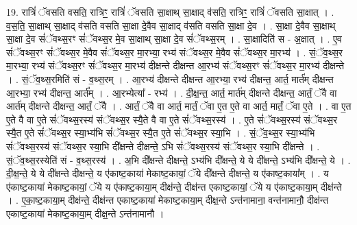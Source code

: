 \documentclass[17pt]{extarticle}
\begin{document}
19. रात्रिं॑ ॅवसति वसति॒ रात्रिꣳ॒॒ रात्रिं॑ ॅवसति सा॒क्षाथ् सा॒क्षाद् व॑सति॒ रात्रिꣳ॒॒ रात्रिं॑ ॅवसति सा॒क्षात् । . व॒स॒ति॒ सा॒क्षाथ् सा॒क्षाद् व॑सति वसति सा॒क्षा दे॒वैव सा॒क्षाद् व॑सति वसति सा॒क्षा दे॒व । . सा॒क्षा दे॒वैव सा॒क्षाथ् सा॒क्षा दे॒व सं॑ॅवथ्स॒रꣳ सं॑ॅवथ्स॒र मे॒व सा॒क्षाथ् सा॒क्षा दे॒व सं॑ॅवथ्स॒रम् । . सा॒क्षादिति॑ स - अ॒क्षात् । . ए॒व सं॑ॅवथ्स॒रꣳ सं॑ॅवथ्स॒र मे॒वैव सं॑ॅवथ्स॒र मा॒रभ्या॒ रभ्य॑ संॅवथ्स॒र मे॒वैव सं॑ॅवथ्स॒र मा॒रभ्य॑ । . सं॒ॅव॒थ्स॒र मा॒रभ्या॒ रभ्य॑ संॅवथ्स॒रꣳ सं॑ॅवथ्स॒र मा॒रभ्य॑ दीक्षन्ते दीक्षन्त आ॒रभ्य॑ संॅवथ्स॒रꣳ सं॑ॅवथ्स॒र मा॒रभ्य॑ दीक्षन्ते । . सं॒ॅव॒थ्स॒रमिति॑ सं - व॒थ्स॒रम् । . आ॒रभ्य॑ दीक्षन्ते दीक्षन्त आ॒रभ्या॒ रभ्य॑ दीक्षन्त॒ आर्त॒ मार्त॑म् दीक्षन्त आ॒रभ्या॒ रभ्य॑ दीक्षन्त॒ आर्त᳚म् । . आ॒रभ्येत्या᳚ - रभ्य॑ । . दी॒क्ष॒न्त॒ आर्त॒ मार्त॑म् दीक्षन्ते दीक्षन्त॒ आर्तं॒ ॅवै वा आर्त॑म् दीक्षन्ते दीक्षन्त॒ आर्तं॒ ॅवै । . आर्तं॒ ॅवै वा आर्त॒ मार्तं॒ ॅवा ए॒त ए॒ते वा आर्त॒ मार्तं॒ ॅवा ए॒ते । . वा ए॒त ए॒ते वै वा ए॒ते सं॑ॅवथ्स॒रस्य॑ संॅवथ्स॒र स्यै॒ते वै वा ए॒ते सं॑ॅवथ्स॒रस्य॑ । . ए॒ते सं॑ॅवथ्स॒रस्य॑ संॅवथ्स॒र स्यै॒त ए॒ते सं॑ॅवथ्स॒र स्या॒भ्य॑भि सं॑ॅवथ्स॒र स्यै॒त ए॒ते सं॑ॅवथ्स॒र स्या॒भि । . सं॒ॅव॒थ्स॒र स्या॒भ्य॑भि सं॑ॅवथ्स॒रस्य॑ संॅवथ्स॒र स्या॒भि दी᳚क्षन्ते दीक्षन्ते॒ ऽभि सं॑ॅवथ्स॒रस्य॑ संॅवथ्स॒र स्या॒भि दी᳚क्षन्ते । . सं॒ॅव॒थ्स॒रस्येति॑ सं - व॒थ्स॒रस्य॑ । . अ॒भि दी᳚क्षन्ते दीक्षन्ते॒ ऽभ्य॑भि दी᳚क्षन्ते॒ ये ये दी᳚क्षन्ते॒ ऽभ्य॑भि दी᳚क्षन्ते॒ ये । . दी॒क्ष॒न्ते॒ ये ये दी᳚क्षन्ते दीक्षन्ते॒ य ए॑काष्ट॒काया॑ मेकाष्ट॒कायां॒ ॅये दी᳚क्षन्ते दीक्षन्ते॒ य ए॑काष्ट॒काया᳚म् । . य ए॑काष्ट॒काया॑ मेकाष्ट॒कायां॒ ॅये य ए॑काष्ट॒काया॒म् दीक्ष॑न्ते॒ दीक्ष॑न्त एकाष्ट॒कायां॒ ॅये य ए॑काष्ट॒काया॒म् दीक्ष॑न्ते । . ए॒का॒ष्ट॒काया॒म् दीक्ष॑न्ते॒ दीक्ष॑न्त एकाष्ट॒काया॑ मेकाष्ट॒काया॒म् दीक्ष॒न्ते ऽन्त॑नामाना॒ वन्त॑नामानौ॒ दीक्ष॑न्त एकाष्ट॒काया॑ मेकाष्ट॒काया॒म् दीक्ष॒न्ते ऽन्त॑नामानौ । \newline
\end{document}
